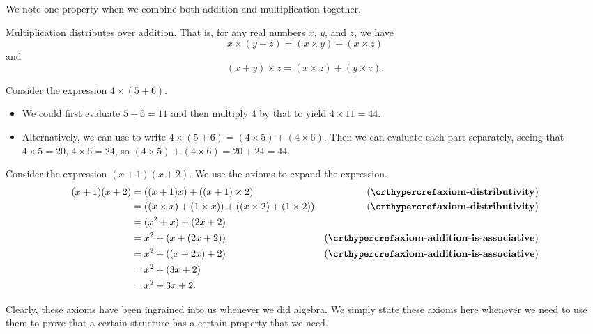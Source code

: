 We note one property when we combine both addition and multiplication together.
\begin{axiom}\label{axiom-distributivity}
    Multiplication distributes over addition. That is, for any real numbers $x$, $y$, and $z$, we have
    \[
        x\times(y+z) = (x\times y) + (x\times z)
    \]
    and
    \[
        (x+y)\times z = (x\times z) + (y\times z).
    \]
\end{axiom}
\begin{example}
    Consider the expression $4\times(5+6)$.
    \begin{itemize}
        \item We could first evaluate $5+6=11$ and then multiply 4 by that to yield $4\times11=44$.
        \item Alternatively, we can use  to write $4\times(5+6) = (4\times5)+(4\times6)$. Then we can evaluate each part separately, seeing that $4\times5 = 20$, $4\times6 = 24$, so $(4\times5)+(4\times6) = 20+24=44$.
    \end{itemize}
\end{example}
\begin{example}
    Consider the expression $(x+1)(x+2)$. We use the axioms to expand the expression.
    \begin{align*}
        (x+1)(x+2) &= ((x+1)x) + ((x+1)\times2) & (\myref{axiom-distributivity})\\
        &= ((x\times x) + (1\times x)) + ((x\times2) + (1\times2)) & (\myref{axiom-distributivity})\\
        &= (x^2+x) + (2x+2)\\
        &= x^2+(x + (2x+2)) & (\myref{axiom-addition-is-associative})\\
        &= x^2+((x + 2x)+2) & (\myref{axiom-addition-is-associative})\\
        &= x^2 + (3x+2)\\
        &= x^2 + 3x + 2.
    \end{align*}
\end{example}

Clearly, these axioms have been ingrained into us whenever we did algebra. We simply state these axioms here whenever we need to use them to prove that a certain structure has a certain property that we need.

\newpage

